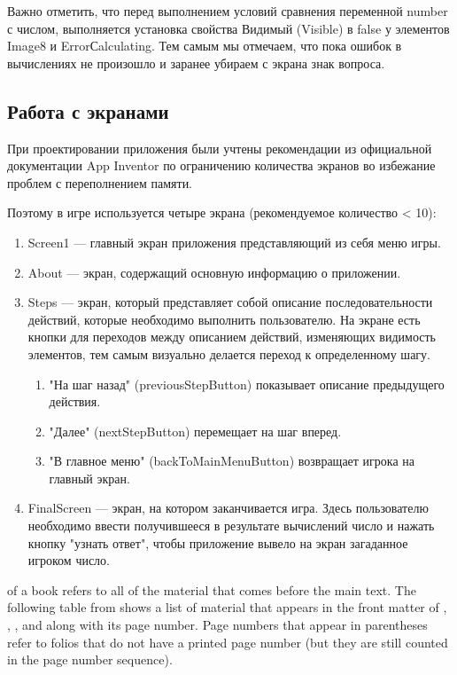 Важно отметить, что перед выполнением условий сравнения переменной number с числом, выполняется установка свойства Видимый (Visible) в false у элементов Image8 и ErrorСalculating. Тем самым мы отмечаем, что пока ошибок в вычислениях не произошло и заранее убираем с экрана знак вопроса.

\subsection{Работа с экранами}
При проектировании приложения были учтены рекомендации из официальной документации App Inventor по ограничению количества экранов во избежание проблем с переполнением памяти.

Поэтому в игре используется четыре экрана (рекомендуемое количество < 10):
\begin{enumerate}
\item Screen1 — главный экран приложения представляющий из себя меню игры.
\item About — экран, содержащий основную информацию о приложении.
\item Steps — экран, который представляет собой описание последовательности действий, которые необходимо выполнить пользователю. На экране есть кнопки для переходов между описанием действий, изменяющих видимость элементов, тем самым визуально делается переход к определенному шагу.
\begin{enumerate}
  \item "На шаг назад" (previousStepButton) показывает описание предыдущего действия.
  \item "Далее" (nextStepButton) перемещает на шаг вперед.
  \item "В главное меню" (backToMainMenuButton) возвращает игрока на главный экран.
\end{enumerate}
\item FinalScreen — экран, на котором заканчивается игра. Здесь пользователю необходимо ввести получившееся в результате вычислений число и нажать кнопку "узнать ответ", чтобы приложение вывело на экран загаданное игроком число.

\end{enumerate}

 of a book refers to all of the material that
comes before the main text.  The following table from shows a list of
material that appears in the front matter of \VDQI, \EI, \VE, and \BE
along with its page number.  Page numbers that appear in parentheses refer
to folios that do not have a printed page number (but they are still
counted in the page number sequence).
